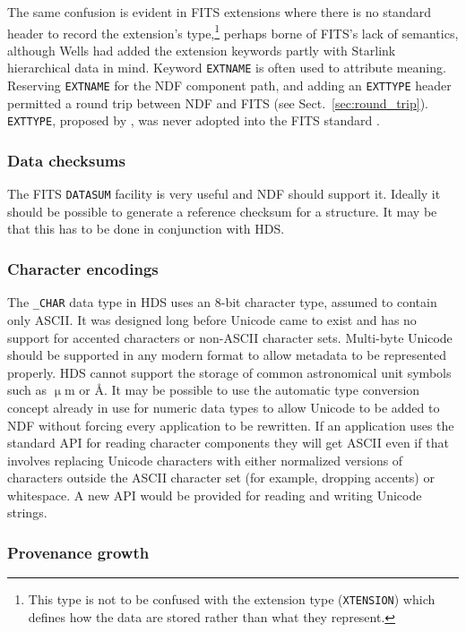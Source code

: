 \documentclass[final,authoryear,5p,times,twocolumn]{elsarticle}
\newcommand*\secref[1]{Sect.~\ref{#1}}
\begin{document}
The same confusion is evident in FITS extensions where there is no
standard header to record the extension's type,\footnote{This type is
not to be confused with the extension type (\texttt{XTENSION}) which
defines how the data are stored rather than what they represent.}
perhaps borne of FITS's lack of semantics, although Wells had added
the extension keywords partly with Starlink hierarchical data in mind.
Keyword \texttt{EXTNAME} is often used to attribute meaning.
Reserving \texttt{EXTNAME} for the NDF component path, and adding an
\texttt{EXTTYPE} header permitted a round trip between NDF and FITS
(see \secref{sec:round_trip}).  \texttt{EXTTYPE}, proposed by
\citet{1993EXTKEYWORDS}, was never adopted into the FITS standard
\citep{1993OGIPMIN}.

\subsubsection{Data checksums}

The FITS \texttt{DATASUM} facility \citep{2012arXiv1201.1345S} is very useful and NDF should support
it. Ideally it should be possible to generate a reference checksum for
a structure. It may be that this has to be done in conjunction with
HDS.

\subsubsection{Character encodings}

The \texttt{\_CHAR} data type in HDS uses an 8-bit character type,
assumed to contain only ASCII. It was designed long before Unicode came to exist
and has no support for accented characters or non-ASCII character
sets. Multi-byte Unicode should be supported in any modern format to
allow metadata to be represented properly. HDS cannot support the
storage of common astronomical unit symbols such as $\upmu$m or \AA.
It may be possible to use the automatic type conversion concept
already in use for numeric data types
to allow Unicode to be added to NDF without forcing every application
to be rewritten. If an application uses the standard API for reading character
components they will get ASCII even if that involves replacing Unicode
characters with either normalized versions of characters outside the
ASCII character set (for example, dropping accents) or whitespace. A new API
would be provided for reading and writing Unicode strings.

\subsubsection{Provenance growth}
\end{document}

